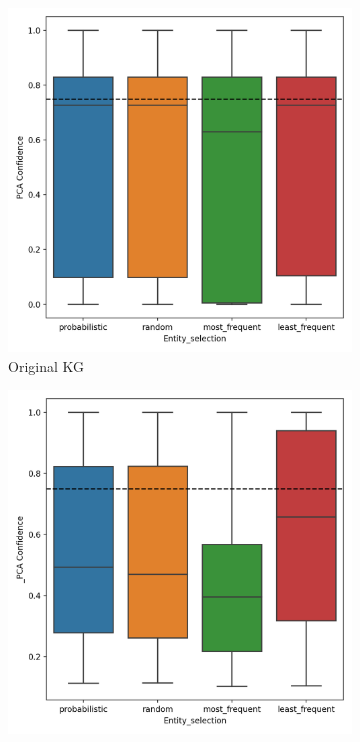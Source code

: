 \begin{figure}[h]
\centering
\begin{subfigure}{.5\textwidth}
  \centering
  \includegraphics[width=1\linewidth]{figures/results/entity_selection/PCA-entity_wn18rr.png}
  \caption{Original KG}
  \label{fig:PCA-entity_wn18rr_boxplot_sub}
\end{subfigure}%
\begin{subfigure}{.5\textwidth}
  \centering
  \includegraphics[width=1\linewidth]{figures/results/entity_selection/_PCA-entity_wn18rr.png}

\end{subfigure}
\end{figure}
